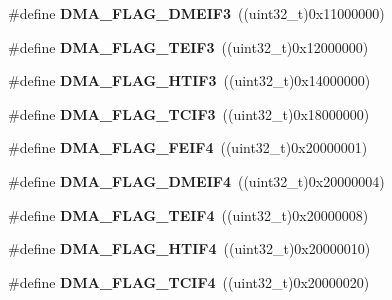 \begin{DoxyCompactItemize}
\#define {\bfseries D\+M\+A\+\_\+\+F\+L\+A\+G\+\_\+\+D\+M\+E\+I\+F3}~((uint32\+\_\+t)0x11000000)
\item 
\mbox{\label{group___d_m_a__flags__definition_ga36854c526eb41566bcf1c4505265433c}} 
\#define {\bfseries D\+M\+A\+\_\+\+F\+L\+A\+G\+\_\+\+T\+E\+I\+F3}~((uint32\+\_\+t)0x12000000)
\item 
\mbox{\label{group___d_m_a__flags__definition_ga10e669df50c5a5fe93b698f75f0574d6}} 
\#define {\bfseries D\+M\+A\+\_\+\+F\+L\+A\+G\+\_\+\+H\+T\+I\+F3}~((uint32\+\_\+t)0x14000000)
\item 
\mbox{\label{group___d_m_a__flags__definition_gae8dde773a36a6d211d718bace2438def}} 
\#define {\bfseries D\+M\+A\+\_\+\+F\+L\+A\+G\+\_\+\+T\+C\+I\+F3}~((uint32\+\_\+t)0x18000000)
\item 
\mbox{\label{group___d_m_a__flags__definition_ga81f626454f81551dffa17619f459b99b}} 
\#define {\bfseries D\+M\+A\+\_\+\+F\+L\+A\+G\+\_\+\+F\+E\+I\+F4}~((uint32\+\_\+t)0x20000001)
\item 
\mbox{\label{group___d_m_a__flags__definition_gae47ce0553cd8c561d0c5a903accf3411}} 
\#define {\bfseries D\+M\+A\+\_\+\+F\+L\+A\+G\+\_\+\+D\+M\+E\+I\+F4}~((uint32\+\_\+t)0x20000004)
\item 
\mbox{\label{group___d_m_a__flags__definition_ga0216244c5386117a965ef6833b86984e}} 
\#define {\bfseries D\+M\+A\+\_\+\+F\+L\+A\+G\+\_\+\+T\+E\+I\+F4}~((uint32\+\_\+t)0x20000008)
\item 
\mbox{\label{group___d_m_a__flags__definition_gac1f371142dd0c1a5a19d8ad2cf1d2f2a}} 
\#define {\bfseries D\+M\+A\+\_\+\+F\+L\+A\+G\+\_\+\+H\+T\+I\+F4}~((uint32\+\_\+t)0x20000010)
\item 
\mbox{\label{group___d_m_a__flags__definition_gaa2a470b95dc9084de45009c600e8cf1d}} 
\#define {\bfseries D\+M\+A\+\_\+\+F\+L\+A\+G\+\_\+\+T\+C\+I\+F4}~((uint32\+\_\+t)0x20000020)
\item 
\mbox{\label{group___d_m_a__flags__definition_ga40621c1df90e9e1ebfb4815df09a2469}} 

\end{DoxyCompactItemize}
